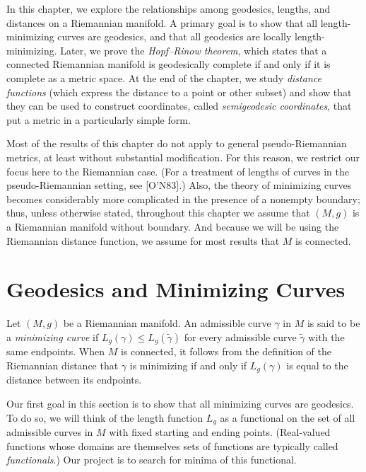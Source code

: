 
In this chapter, we explore the relationships among geodesics, lengths, and distances on a Riemannian manifold. A primary goal is to show that all length-minimizing curves are geodesics, and that all geodesics are locally length-minimizing. Later, we prove the \emph{Hopf--Rinow theorem}, which states that a connected Riemannian manifold is geodesically complete if and only if it is complete as a metric space. At the end of the chapter, we study \emph{distance functions} (which express the distance to a point or other subset) and show that they can be used to construct coordinates, called \emph{semigeodesic coordinates}, that put a metric in a particularly simple form.

Most of the results of this chapter do not apply to general pseudo-Riemannian metrics, at least without substantial modification. For this reason, we restrict our focus here to the Riemannian case. (For a treatment of lengths of curves in the pseudo-Riemannian setting, see [O'N83].) Also, the theory of minimizing curves becomes considerably more complicated in the presence of a nonempty boundary; thus, unless otherwise stated, throughout this chapter we assume that $(M, g)$ is a Riemannian manifold without boundary. And because we will be using the Riemannian distance function, we assume for most results that $M$ is connected.

\section{Geodesics and Minimizing Curves}

Let $(M,g)$ be a Riemannian manifold. An admissible curve $\gamma$ in $M$ is said to be a \emph{minimizing curve} if $L_g(\gamma) \le L_g(\tilde{\gamma})$ for every admissible curve $\tilde{\gamma}$ with the same endpoints. When $M$ is connected, it follows from the definition of the Riemannian distance that $\gamma$ is minimizing if and only if $L_g(\gamma)$ is equal to the distance between its endpoints.

Our first goal in this section is to show that all minimizing curves are geodesics. To do so, we will think of the length function $L_g$ as a functional on the set of all admissible curves in $M$ with fixed starting and ending points. (Real-valued functions whose domains are themselves sets of functions are typically called \emph{functionals}.) Our project is to search for minima of this functional.

